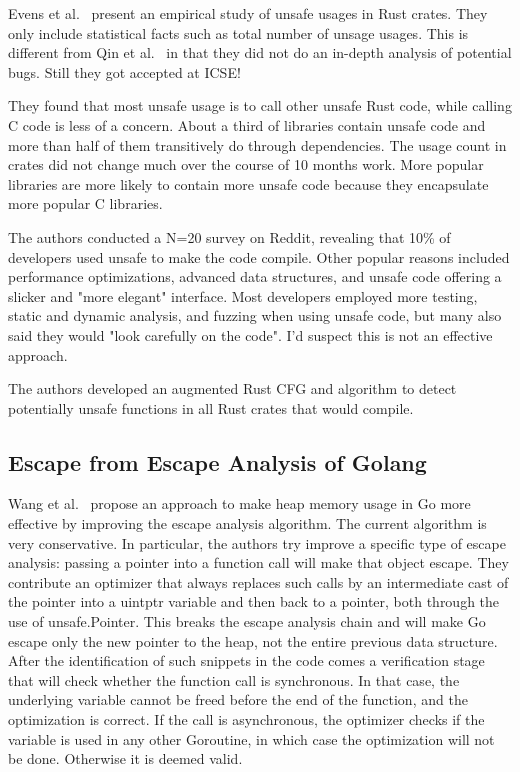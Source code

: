 Evens et al.~\cite{evans2020} present an empirical study of unsafe usages in Rust crates.
They only include statistical facts such as total number of unsage usages.
This is different from Qin et al.~\cite{qin2020} in that they did not do an in-depth analysis of potential bugs.
Still they got accepted at ICSE!

They found that most unsafe usage is to call other unsafe Rust code, while calling C code is less of a concern.
About a third of libraries contain unsafe code and more than half of them transitively do through dependencies.
The usage count in crates did not change much over the course of 10 months work.
More popular libraries are more likely to contain more unsafe code because they encapsulate more popular C libraries.

The authors conducted a N=20 survey on Reddit, revealing that 10\% of developers used unsafe to make the code compile.
Other popular reasons included performance optimizations, advanced data structures, and unsafe code offering a slicker
and "more elegant" interface.
Most developers employed more testing, static and dynamic analysis, and fuzzing when using unsafe code, but many also
said they would "look carefully on the code".
I'd suspect this is not an effective approach.

The authors developed an augmented Rust CFG and algorithm to detect potentially unsafe functions in all Rust crates that
would compile.



\subsection{Escape from Escape Analysis of Golang}
\label{subsec:escape-from-escape-analysis-of-golang}

Wang et al.~\cite{wang2020} propose an approach to make heap memory usage in Go more effective by improving the escape
analysis algorithm.
The current algorithm is very conservative.
In particular, the authors try improve a specific type of escape analysis: passing a pointer into a function call will
make that object escape.
They contribute an optimizer that always replaces such calls by an intermediate cast of the pointer into a uintptr
variable and then back to a pointer, both through the use of unsafe.Pointer.
This breaks the escape analysis chain and will make Go escape only the new pointer to the heap, not the entire previous
data structure.
After the identification of such snippets in the code comes a verification stage that will check whether the function
call is synchronous.
In that case, the underlying variable cannot be freed before the end of the function, and the optimization is correct.
If the call is asynchronous, the optimizer checks if the variable is used in any other Goroutine, in which case the
optimization will not be done.
Otherwise it is deemed valid.

